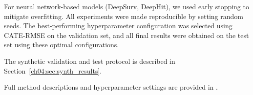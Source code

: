 For neural network-based models (DeepSurv, DeepHit), we used early stopping to mitigate overfitting.
All experiments were made reproducible by setting random seeds.
The best-performing hyperparameter configuration was selected using CATE-RMSE on the validation set, and all final results were obtained on the test set using these optimal configurations.

The synthetic validation and test protocol is described in Section~\ref{ch04:sec:synth_results}.

Full method descriptions and hyperparameter settings are provided in \citet[Appendices D--E, Tables 9--12]{noroozizadeh2026survhte}.
